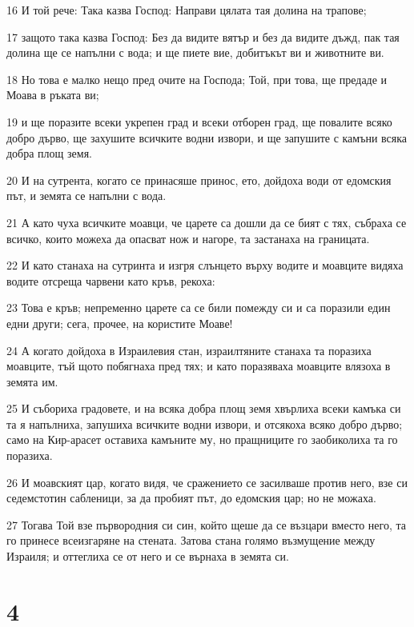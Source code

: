\par 16 И той рече: Така казва Господ: Направи цялата тая долина на трапове;
\par 17 защото така казва Господ: Без да видите вятър и без да видите дъжд, пак тая долина ще се напълни с вода; и ще пиете вие, добитъкът ви и животните ви.
\par 18 Но това е малко нещо пред очите на Господа; Той, при това, ще предаде и Моава в ръката ви;
\par 19 и ще поразите всеки укрепен град и всеки отборен град, ще повалите всяко добро дърво, ще захушите всичките водни извори, и ще запушите с камъни всяка добра площ земя.
\par 20 И на сутрента, когато се принасяше принос, ето, дойдоха води от едомския път, и земята се напълни с вода.
\par 21 А като чуха всичките моавци, че царете са дошли да се бият с тях, събраха се всичко, които можеха да опасват нож и нагоре, та застанаха на границата.
\par 22 И като станаха на сутринта и изгря слънцето върху водите и моавците видяха водите отсреща чарвени като кръв, рекоха:
\par 23 Това е кръв; непременно царете са се били помежду си и са поразили един едни други; сега, прочее, на користите Моаве!
\par 24 А когато дойдоха в Израилевия стан, израилтяните станаха та поразиха моавците, тъй щото побягнаха пред тях; и като поразяваха моавците влязоха в земята им.
\par 25 И събориха градовете, и на всяка добра площ земя хвърлиха всеки камъка си та я напълниха, запушиха всичките водни извори, и отсякоха всяко добро дърво; само на Кир-арасет оставиха камъните му, но пращниците го заобиколиха та го поразиха.
\par 26 И моавският цар, когато видя, че сражението се засилваше против него, взе си седемстотин сабленици, за да пробият път, до едомския цар; но не можаха.
\par 27 Тогава Той взе първородния си син, който щеше да се възцари вместо него, та го принесе всеизгаряне на стената. Затова стана голямо възмущение между Израиля; и оттеглиха се от него и се върнаха в земята си.

\chapter{4}


